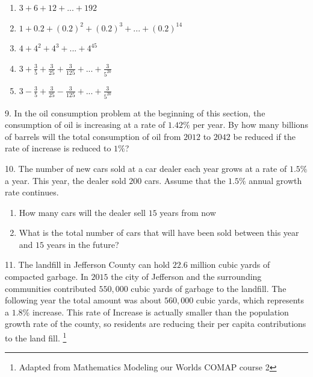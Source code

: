 \documentclass[10pt,]{book}
\theoremstyle{plain}
\theoremstyle{definition}
\theoremstyle{definition}
\theoremstyle{definition}
\numberwithin{equation}{section}
\begin{document}
\begin{exerciselist}
\leavevmode%
\begin{enumerate}[label=(\alph*)]
\item\hypertarget{li-82}{}\(3 + 6 + 12 + ... + 192\)%
\item\hypertarget{li-83}{}\(1 + 0.2 + (0.2)^2 + (0.2)^3 + ... + (0.2)^14\)%
\item\hypertarget{li-84}{}\(4 + 4^2 + 4^3 + ... + 4^45\)%
\item\hypertarget{li-85}{}\(3 + \frac{3}{5} + \frac{3}{25} + \frac{3}{125} + ... + \frac{3}{5^{20}}\)%
\item\hypertarget{li-86}{}\(3 - \frac{3}{5} + \frac{3}{25} - \frac{3}{125} + ... + \frac{3}{5^{20}}\)%
\end{enumerate}
\par\smallskip
\item[9.]\hypertarget{exercise-40}{}In the oil consumption problem at the beginning of this section, the consumption of oil is increasing at a rate of \(1.42\%\) per year. By how many billions of barrels will the total consumption of oil from \(2012\) to \(2042\) be reduced if the rate of increase is reduced to \(1\%\)?%
\par\smallskip
\item[10.]\hypertarget{exercise-41}{}The number of new cars sold at a car dealer each year grows at a rate of \(1.5\%\) a year. This year, the dealer sold \(200\) cars. Assume that the \(1.5\%\) annual growth rate continues.%
\leavevmode%
\begin{enumerate}[label=(\alph*)]
\item\hypertarget{li-87}{}How many cars will the dealer sell \(15\) years from now%
\item\hypertarget{li-88}{}What is the total number of cars that will have been sold between this year and \(15\) years in the future?%
\end{enumerate}
\par\smallskip
\item[11.]\hypertarget{exercise-42}{}The landfill in Jefferson County can hold \(22.6\) million cubic yards of compacted garbage. In \(2015\) the city of Jefferson and the surrounding communities contributed \(550,000\) cubic yards of garbage to the landfill. The following year the total amount was about \(560,000\) cubic yards, which represents a \(1.8\%\) increase. This rate of Increase is actually smaller than the population growth rate of the county, so residents are reducing their per capita contributions to the land fill. \footnote{Adapted from Mathematics Modeling our Worlds COMAP course 2\label{fn-2}}%

\end{exerciselist}
\end{document}

